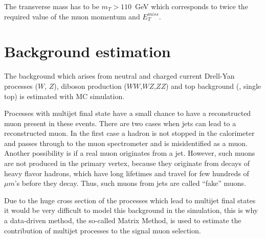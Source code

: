 The transverse mass has to be $m_T > 110$~GeV which corresponds to twice the required  value of the muon
momentum and $E_T^{miss}$.


\section{Background estimation}
\label{sec:wprime_backgroundEstimation}

The background which arises from neutral and charged current Drell-Yan processes ($W$, $Z$), diboson production ($WW$,$WZ$,$ZZ$) and top background  (\ttbar, single top) is estimated with MC simulation.

Processes with multijet final state have a small chance 
to have a reconstructed muon present in these events.
There are two cases when jets can lead to a reconstructed muon. 
In the first case a hadron is not stopped in the calorimeter and passes through to the muon spectrometer and is misidentified as a muon. Another possibility is if a real muon originates from a jet. However, such muons are not produced in the primary vertex, because they originate from decays of heavy flavor hadrons, which have long lifetimes and travel for few hundreds of $\mu m$'s before they decay.
Thus, such muons from jets are called ``fake'' muons.

Due to the huge cross section of the processes which lead to multijet final states 
it would be very difficult to model this background in the simulation,
this is why a data-driven method,
the so-called Matrix Method, is used to estimate the contribution of multijet processes to the signal muon selection.

